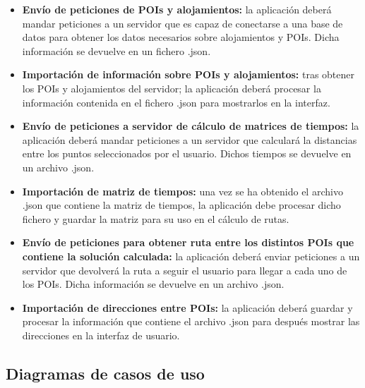 \begin{itemize}
	\item \textbf{Envío de peticiones de POIs y alojamientos:} la aplicación deberá mandar peticiones a un servidor que es capaz de conectarse a una base de datos para obtener los datos necesarios sobre alojamientos y POIs. Dicha información se devuelve en un fichero .json.
	\item \textbf{Importación de información sobre POIs y alojamientos:} tras obtener los POIs y alojamientos del servidor; la aplicación deberá procesar la información contenida en el fichero .json para mostrarlos en la interfaz.
	\item \textbf{Envío de peticiones a servidor de cálculo de matrices de tiempos:} la aplicación deberá mandar peticiones a un servidor que calculará la distancias entre los puntos seleccionados por el usuario. Dichos tiempos se devuelve en un archivo .json.
	\item \textbf{Importación de matriz de tiempos:} una vez se ha obtenido el archivo .json que contiene la matriz de tiempos, la aplicación debe procesar dicho fichero y guardar la matriz para su uso en el cálculo de rutas.
	\item \textbf{Envío de peticiones para obtener ruta entre los distintos POIs que contiene la solución calculada:} la aplicación deberá enviar peticiones a un servidor que devolverá la ruta a seguir el usuario para llegar a cada uno de los POIs. Dicha información se devuelve en un archivo .json.
	
	\item \textbf{Importación de direcciones entre POIs:} la aplicación deberá guardar y procesar la información que contiene el archivo .json para después mostrar las direcciones en la interfaz de usuario.
\end{itemize}

\subsection[Casos de uso]{Diagramas de casos de uso}
